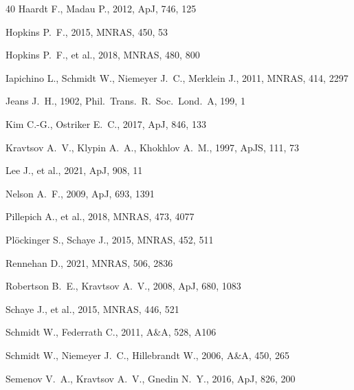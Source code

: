 \documentclass[fleqn,usenatbib]{mnras}
\begin{document}
\begin{thebibliography}{40}
Haardt F., Madau P., 2012, ApJ, 746, 125

Hopkins P.~F., 2015, MNRAS, 450, 53

Hopkins P.~F., et al., 2018, MNRAS, 480, 800

Iapichino L., Schmidt W., Niemeyer J.~C., Merklein J., 2011, MNRAS, 414,
2297

Jeans J.~H., 1902, Phil.\ Trans.\ R.\ Soc.\ Lond.\ A, 199, 1

Kim C.-G., Ostriker E.~C., 2017, ApJ, 846, 133

Kravtsov A.~V., Klypin A.~A., Khokhlov A.~M., 1997, ApJS, 111, 73

Lee J., et al., 2021, ApJ, 908, 11

Nelson A.~F., 2009, ApJ, 693, 1391

Pillepich A., et al., 2018, MNRAS, 473, 4077

Pl\"ockinger S., Schaye J., 2015, MNRAS, 452, 511

Rennehan D., 2021, MNRAS, 506, 2836

Robertson B.~E., Kravtsov A.~V., 2008, ApJ, 680, 1083

Schaye J., et al., 2015, MNRAS, 446, 521

Schmidt W., Federrath C., 2011, A\&A, 528, A106

Schmidt W., Niemeyer J.~C., Hillebrandt W., 2006, A\&A, 450, 265

Semenov V.~A., Kravtsov A.~V., Gnedin N.~Y., 2016, ApJ, 826, 200


\end{thebibliography}
\end{document}
